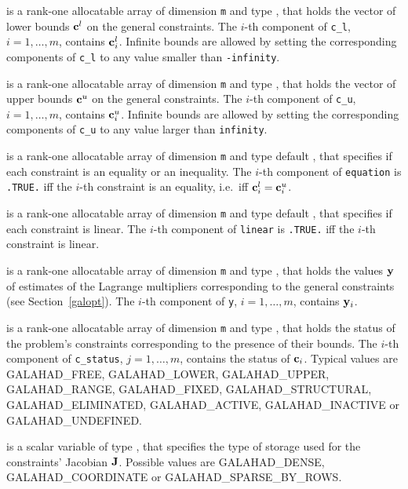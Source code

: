 \documentclass{galahad}
\newcommand{\sym}{\sf\small}
\begin{document}
\begin{description}
 is a rank-one allocatable array of dimension {\tt m} and type 
\realdp, that holds the vector of lower bounds ${\mathbf{c}}^{l}$ 
on the general constraints. The $i$-th component of 
{\tt c\_l}, $i = 1, \ldots , m$, contains ${\mathbf{c}}_{i}^{l}$.
Infinite bounds are allowed by setting the corresponding 
components of {\tt c\_l} to any value smaller than {\tt -infinity}. 

 is a rank-one allocatable array of dimension {\tt m} and type 
\realdp, that holds the vector of upper bounds ${\mathbf{c}}^{u}$ 
on the general constraints. The $i$-th component of 
{\tt c\_u}, $i = 1,  \ldots ,  m$, contains ${\mathbf{c}}_{i}^{u}$.
Infinite bounds are allowed by setting the corresponding 
components of {\tt c\_u} to any value larger than {\tt infinity}.

 is a rank-one allocatable array of dimension {\tt m} and
type default \logical, that specifies if each constraint is an equality
or an inequality. The $i$-th component of {\tt equation} is {\tt .TRUE.}
iff the $i$-th constraint is an equality, i.e.\ iff ${\mathbf{c}}^l_i = {\mathbf{c}}^u_i$.

 is a rank-one allocatable array of dimension {\tt m} and
type default \logical, that specifies if each constraint is linear.
The $i$-th component of {\tt linear} is {\tt .TRUE.}
iff the $i$-th constraint is linear.

 is a rank-one allocatable array of dimension {\tt m} and type 
\realdp, that holds
the values ${\mathbf{y}}$ of estimates  of the Lagrange multipliers
corresponding to the general constraints (see Section~\ref{galopt}).
The $i$-th component of {\tt y}, $i = 1,  \ldots ,  m$, contains ${\mathbf{y}}_{i}$.  

 is  a rank-one allocatable array of dimension {\tt m} and type 
\integer, that holds the status of the problem's constraints
corresponding to the presence of their bounds. The $i$-th component of 
{\tt c\_status}, $j = 1,  \ldots ,  m$, contains the status of ${\mathbf{c}}_i$.
Typical values are
{\sym GALAHAD\_FREE},  {\sym GALAHAD\_LOWER}, {\sym GALAHAD\_UPPER},
{\sym GALAHAD\_RANGE}, {\sym GALAHAD\_FIXED}, {\sym GALAHAD\_STRUCTURAL},
{\sym GALAHAD\_ELIMINATED}, {\sym GALAHAD\_ACTIVE}, 
{\sym GALAHAD\_INACTIVE} or {\sym GALAHAD\_UNDEFINED}.
        
 is a scalar variable of type \integer, 
that specifies the type of storage used for the 
constraints' Jacobian ${\mathbf{J}}$.
Possible values are {\sym GALAHAD\_DENSE}, {\sym GALAHAD\_COORDINATE} 
or {\sym GALAHAD\_SPARSE\_BY\_ROWS}.
              

\end{description}
\end{document}
